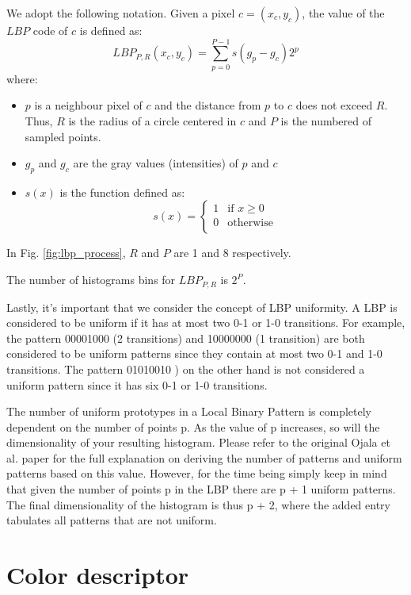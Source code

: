 We adopt the following notation. Given a pixel $c = (x_c, y_c)$, the value of the $LBP$ code of $c$ is defined as:
$$LBP_{P, R} (x_c, y_c) = \sum_{p = 0}^{P - 1} s (g_p - g_c) 2^p$$
where:
\begin{itemize}
    \item $p$ is a neighbour pixel of $c$ and the distance from $p$ to $c$ does not exceed $R$. Thus, $R$ is the radius of a circle centered in $c$ and $P$ is the numbered of sampled points.
    \item $g_p$ and $g_c$ are the gray values (intensities) of $p$ and $c$
    \item $s(x)$ is the function defined as:
    \begin{equation}
    s(x) =
    \begin{cases}
    1 & \text{if $x \geq 0$}\\
    0 & \text{otherwise} \\
    \end{cases}
    \end{equation}
\end{itemize}

In Fig. \ref{fig:lbp_process}, $R$ and $P$ are 1 and 8 respectively.

The number of histograms bins for $LBP_{P, R}$ is $2^P$.

Lastly, it’s important that we consider the concept of LBP uniformity. A LBP is considered to be uniform if it has at most two 0-1 or 1-0 transitions. For example, the pattern 00001000  (2 transitions) and 10000000  (1 transition) are both considered to be uniform patterns since they contain at most two 0-1 and 1-0 transitions. The pattern 01010010 ) on the other hand is not considered a uniform pattern since it has six 0-1 or 1-0 transitions.

The number of uniform prototypes in a Local Binary Pattern is completely dependent on the number of points p. As the value of p increases, so will the dimensionality of your resulting histogram. Please refer to the original Ojala et al. paper for the full explanation on deriving the number of patterns and uniform patterns based on this value. However, for the time being simply keep in mind that given the number of points p in the LBP there are p + 1 uniform patterns. The final dimensionality of the histogram is thus p + 2, where the added entry tabulates all patterns that are not uniform.

\section{Color descriptor}

